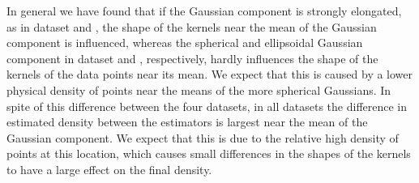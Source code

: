 In general we have found that if the Gaussian component is strongly elongated, as in dataset \baakmanFour and \baakmanFive, the shape of the kernels near the mean of the Gaussian component is influenced, whereas the spherical and ellipsoidal Gaussian component in dataset \ferdosiOne and \baakmanOne, respectively, hardly influences the shape of the kernels of the data points near its mean. We expect that this is caused by a lower physical density of points near the means of the more spherical Gaussians. 
In spite of this difference between the four datasets, in all datasets the difference in estimated density between the estimators is largest near the mean of the Gaussian component. We expect that this is due to the relative high density of points at this location, which causes small differences in the shapes of the kernels to have a large effect on the final density. 